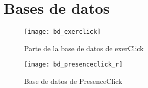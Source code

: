 \pagestyle{fancy}

\chapter{Bases de datos}
\label{anexo-c}

\begin{figure}[!htbp]
	\centering
	\texttt{[image: bd\_exerclick]}
	\caption{Parte de la base de datos de exerClick}
	\label{fig:anexo-c:1}
\end{figure}

\begin{figure}[!htbp]
	\centering
	\texttt{[image: bd\_presenceclick\_r]}
	\caption{Base de datos de PresenceClick}
	\label{fig:anexo-c:2}
\end{figure}